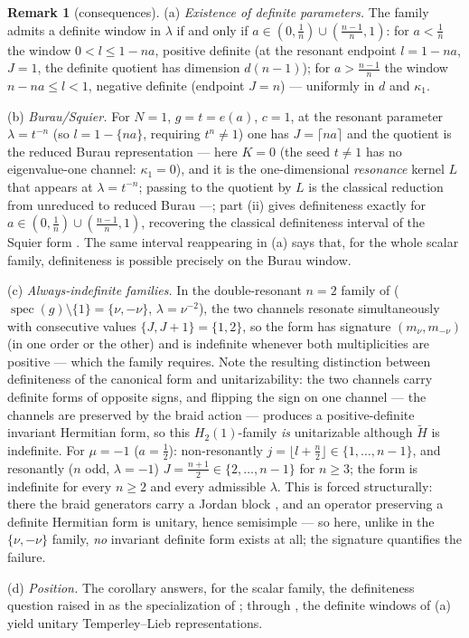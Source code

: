 \documentclass[11pt]{article}
\theoremstyle{definition}
\newtheorem{remark}[theorem]{Remark}
\newcommand{\Ht}{\widetilde H}
\newcommand{\frc}[1]{\{#1\}}
\begin{document}
\begin{remark}[consequences]\label{rem:hecke-consequences}
(a) \emph{Existence of definite parameters.} The family admits a
definite window in $\lambda$ if and only if
$a\in(0,\tfrac1n)\cup(\tfrac{n-1}n,1)$: for $a<\tfrac1n$ the window
$0<l\le1-na$, positive definite (at the resonant endpoint $l=1-na$,
$J=1$, the definite quotient has dimension $d(n-1)$); for
$a>\tfrac{n-1}n$ the window $n-na\le l<1$, negative definite
(endpoint $J=n$) --- uniformly in $d$ and $\kappa_1$.

(b) \emph{Burau/Squier.} For $N=1$, $g=t=e(a)$, $c=1$, at the
resonant parameter $\lambda=t^{-n}$ (so $l=1-\frc{na}$, requiring
$t^{n}\neq1$) one has $J=\lceil na\rceil$ and the quotient is the
reduced Burau representation \cite[Ex.~4.10]{N-Hecke} --- here $K=0$ (the
seed $t\neq1$ has no eigenvalue-one channel: $\kappa_1=0$), and it
is the one-dimensional \emph{resonance} kernel $L$ that appears at
$\lambda=t^{-n}$; passing to the quotient by $L$ is the classical
reduction from unreduced to reduced Burau ---; part (ii) gives
definiteness exactly for $a\in(0,\tfrac1n)\cup(\tfrac{n-1}n,1)$,
recovering the classical definiteness interval of the Squier form
\cite{Squier}.
The same interval reappearing in (a) says that, for the whole scalar
family, definiteness is possible precisely on the Burau window.

(c) \emph{Always-indefinite families.} In the double-resonant $n=2$
family of \cite[Thm.~4.4(iv)(b)]{N-Hecke}
($\operatorname{spec}(g)\setminus\{1\}=\{\nu,-\nu\}$,
$\lambda=\nu^{-2}$), the two channels resonate simultaneously with
consecutive values $\{J,J+1\}=\{1,2\}$, so the form has signature
$(m_{\nu},m_{-\nu})$ (in one order or the other) and is indefinite
whenever both multiplicities are positive --- which the family
requires. Note the resulting distinction between definiteness of the
canonical form and unitarizability: the two channels carry definite
forms of opposite signs, and flipping the sign on one channel --- the
channels are preserved by the braid action --- produces a
positive-definite invariant Hermitian form, so this $H_2(1)$-family
\emph{is} unitarizable although $\Ht$ is indefinite. For $\mu=-1$ ($a=\tfrac12$): non-resonantly
$j=\lfloor l+\tfrac n2\rfloor\in\{1,\dots,n-1\}$, and resonantly
($n$ odd, $\lambda=-1$) $J=\tfrac{n+1}2\in\{2,\dots,n-1\}$ for
$n\ge3$; the form is indefinite for every $n\ge2$ and every
admissible $\lambda$. This is forced structurally: there the braid
generators carry a Jordan block \cite[Rem.~4.7]{N-Hecke}, and an operator
preserving a definite Hermitian form is unitary, hence semisimple ---
so here, unlike in the $\{\nu,-\nu\}$ family, \emph{no} invariant
definite form exists at all; the signature quantifies the failure.

(d) \emph{Position.} The corollary answers, for the scalar family,
the definiteness question raised in \cite[Rem.~4.12 and \S6]{N-Hecke} as the
specialization of \cite[Problem~18]{N-KLM}; through
\cite[Rem.~4.12]{N-Hecke}, the definite windows of (a) yield unitary
Temperley--Lieb representations.
\end{remark}
\end{document}
